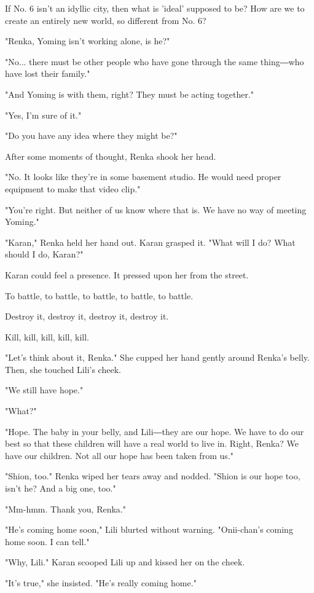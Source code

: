 If No. 6 isn't an idyllic city, then what is 'ideal' supposed to be? How
are we to create an entirely new world, so different from No. 6?

"Renka, Yoming isn't working alone, is he?"

"No... there must be other people who have gone through the same
thing―who have lost their family."

"And Yoming is with them, right? They must be acting together."

"Yes, I'm sure of it."

"Do you have any idea where they might be?"

After some moments of thought, Renka shook her head.

"No. It looks like they're in some basement studio. He would need proper
equipment to make that video clip."

"You're right. But neither of us know where that is. We have no way of
meeting Yoming."

"Karan," Renka held her hand out. Karan grasped it. "What will I do?
What should I do, Karan?"

Karan could feel a presence. It pressed upon her from the street.

To battle, to battle, to battle, to battle, to battle.

Destroy it, destroy it, destroy it, destroy it.

Kill, kill, kill, kill, kill.

"Let's think about it, Renka." She cupped her hand gently around Renka's
belly. Then, she touched Lili's cheek.

"We still have hope."

"What?"

"Hope. The baby in your belly, and Lili―they are our hope. We have to do
our best so that these children will have a real world to live in.
Right, Renka? We have our children. Not all our hope has been taken from
us."

"Shion, too." Renka wiped her tears away and nodded. "Shion is our hope
too, isn't he? And a big one, too."

"Mm-hmm. Thank you, Renka."

"He's coming home soon," Lili blurted without warning. "Onii-chan's
coming home soon. I can tell."

"Why, Lili." Karan scooped Lili up and kissed her on the cheek.

"It's true," she insisted. "He's really coming home."

